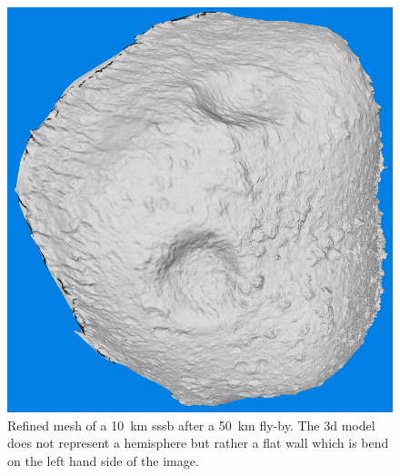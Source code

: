 \begin{figure}[htb]
    \centering
    \includegraphics[width=.5\textwidth]{doc/thesis/0_figures/models_quality/50_10/120_50_10_refine1.png}
    \caption{Refined mesh of a \SI{10}{\kilo\meter} \gls{sssb} after a \SI{50}{\kilo\meter} fly-by. The \gls{3d} model does not represent a hemisphere but rather a flat wall which is bend on the left hand side of the image.}
    \label{fig:model_flat}
\end{figure}

